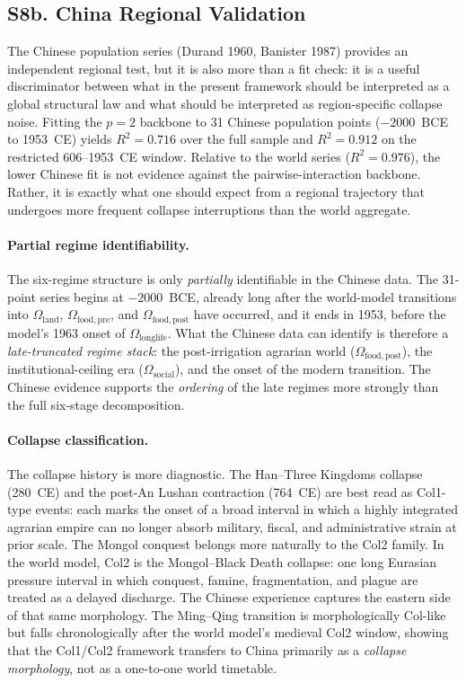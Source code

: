 \documentclass[11pt]{article}
\begin{document}
\subsection*{S8b. China Regional Validation}

The Chinese population series (Durand 1960, Banister 1987) provides an independent regional test, but it is also more than a fit check: it is a useful discriminator between what in the present framework should be interpreted as a global structural law and what should be interpreted as region-specific collapse noise.
Fitting the $p=2$ backbone to 31 Chinese population points ($-2000$~BCE to 1953~CE) yields $R^2=0.716$ over the full sample and $R^2=0.912$ on the restricted 606--1953~CE window.
Relative to the world series ($R^2=0.976$), the lower Chinese fit is not evidence against the pairwise-interaction backbone.
Rather, it is exactly what one should expect from a regional trajectory that undergoes more frequent collapse interruptions than the world aggregate.

\paragraph{Partial regime identifiability.}
The six-regime structure is only \emph{partially} identifiable in the Chinese data.
The 31-point series begins at $-2000$~BCE, already long after the world-model transitions into $\Omega_{\mathrm{land}}$, $\Omega_{\mathrm{food,pre}}$, and $\Omega_{\mathrm{food,post}}$ have occurred, and it ends in 1953, before the model's 1963 onset of $\Omega_{\mathrm{longlife}}$.
What the Chinese data can identify is therefore a \emph{late-truncated regime stack}: the post-irrigation agrarian world ($\Omega_{\mathrm{food,post}}$), the institutional-ceiling era ($\Omega_{\mathrm{social}}$), and the onset of the modern transition.
The Chinese evidence supports the \emph{ordering} of the late regimes more strongly than the full six-stage decomposition.

\paragraph{Collapse classification.}
The collapse history is more diagnostic.
The Han--Three Kingdoms collapse (280~CE) and the post-An Lushan contraction (764~CE) are best read as Col1-type events: each marks the onset of a broad interval in which a highly integrated agrarian empire can no longer absorb military, fiscal, and administrative strain at prior scale.
The Mongol conquest belongs more naturally to the Col2 family.
In the world model, Col2 is the Mongol--Black Death collapse: one long Eurasian pressure interval in which conquest, famine, fragmentation, and plague are treated as a delayed discharge.
The Chinese experience captures the eastern side of that same morphology.
The Ming--Qing transition is morphologically Col-like but falls chronologically after the world model's medieval Col2 window, showing that the Col1/Col2 framework transfers to China primarily as a \emph{collapse morphology}, not as a one-to-one world timetable.
\end{document}
